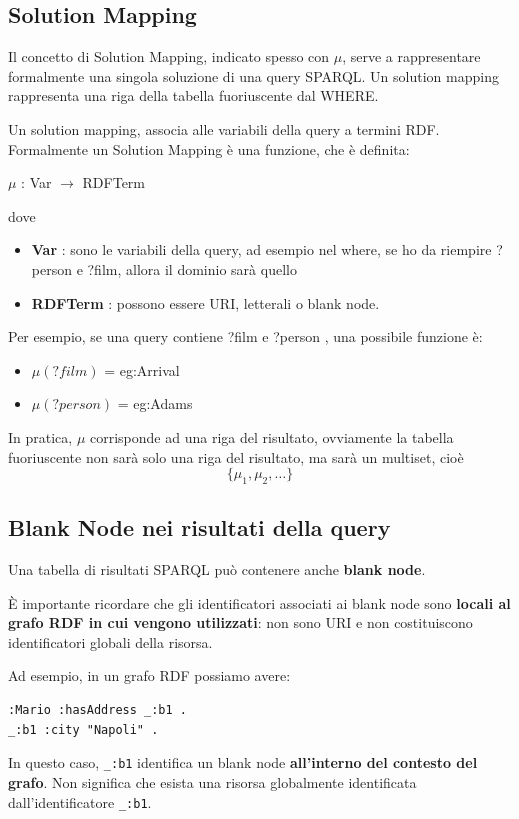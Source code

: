 \subsection{Solution Mapping}
Il concetto di Solution Mapping, indicato spesso con $\mu$, serve a rappresentare formalmente
una singola soluzione di una query SPARQL. Un solution mapping rappresenta una riga della tabella fuoriuscente dal WHERE.


Un solution mapping, associa alle variabili della query a termini RDF. Formalmente un Solution Mapping è una funzione, che è definita:
\begin{center}
    $\mu$ : Var $\to$ RDFTerm
\end{center}
dove
\begin{itemize}
    \item \textbf{Var} : sono le variabili della query, ad esempio nel where, se ho da riempire ?person e ?film, allora il dominio sarà quello
    \item \textbf{RDFTerm} :  possono essere URI, letterali o blank node.
\end{itemize}

Per esempio, se una query contiene ?film e ?person , una possibile funzione è:
\begin{itemize}
    \item $\mu(?film)$ = eg:Arrival
    \item $\mu(?person)$ = eg:Adams
\end{itemize}
In pratica, $\mu$ corrisponde ad una riga del risultato, ovviamente la tabella fuoriuscente non sarà solo una riga del risultato,
ma sarà un multiset, cioè
\[
\{\mu_1, \mu_2, \dots\}
\]
\subsection{Blank Node nei risultati della query}

Una tabella di risultati SPARQL può contenere anche \textbf{blank node}.

È importante ricordare che gli identificatori associati ai blank node sono \textbf{locali al grafo RDF in cui vengono utilizzati}: non sono URI e non costituiscono identificatori globali della risorsa.

Ad esempio, in un grafo RDF possiamo avere:

\begin{lstlisting}
:Mario :hasAddress _:b1 .
_:b1 :city "Napoli" .
\end{lstlisting}

In questo caso, \texttt{\_:b1} identifica un blank node \textbf{all'interno del contesto del grafo}. Non significa che esista una risorsa globalmente identificata dall'identificatore \texttt{\_:b1}.

